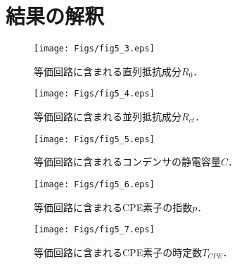 \section{結果の解釈}
\begin{figure}[h]
	\begin{center}
	\texttt{[image: Figs/fig5\_3.eps]} 
	\end{center}
	\caption{
		等価回路に含まれる直列抵抗成分$R_0$．
	} 
	\label{fig:fig5_3}
\end{figure}
\begin{figure}[h]
	\begin{center}
	\texttt{[image: Figs/fig5\_4.eps]} 
	\end{center}
	\caption{
		等価回路に含まれる並列抵抗成分$R_{ct}$．
	} 
	\label{fig:fig5_4}
\end{figure}
\begin{figure}[h]
	\begin{center}
	\texttt{[image: Figs/fig5\_5.eps]} 
	\end{center}
	\caption{
		等価回路に含まれるコンデンサの静電容量$C$．
	} 
	\label{fig:fig5_5}
\end{figure}
\begin{figure}[h]
	\begin{center}
	\texttt{[image: Figs/fig5\_6.eps]} 
	\end{center}
	\caption{
		等価回路に含まれるCPE素子の指数$p$．
	} 
	\label{fig:fig5_6}
\end{figure}
\begin{figure}[h]
	\begin{center}
	\texttt{[image: Figs/fig5\_7.eps]} 
	\end{center}
	\caption{
		等価回路に含まれるCPE素子の時定数$T_{CPE}$．
	} 
	\label{fig:fig5_7}
\end{figure}
